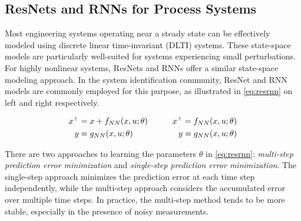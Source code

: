 \documentclass[fontsize=11pt]{article}
\theoremstyle{definition}
\begin{document}
\subsection{ResNets and RNNs for Process Systems}

Most engineering systems operating near a steady state can be effectively modeled 
using discrete linear time-invariant (DLTI) systems. These state-space models are 
particularly well-suited for systems experiencing small perturbations.
For highly nonlinear systems, ResNets and RNNs offer a similar state-space modeling 
approach. In the system identification community, ResNet and RNN models are commonly 
employed for this purpose, as illustrated in \cref{eq:resrnn} on left and right respectively.

\begin{align}
    x^+ &= x + f_{NN} (x, u; \theta) &\qquad x^+ = f_{NN} (x, u; \theta)\notag \\ 
    y &= g_{NN} (x, u; \theta) &\qquad y = g_{NN} (x, u; \theta)
    \label{eq:resrnn}
\end{align}

There are two approaches to learning the parameters $\theta$ in \cref{eq:resrnn}: 
\textit{multi-step prediction error minimization} and \textit{single-step prediction 
error minimization}. 
The single-step approach minimizes the prediction error at each time step independently, 
while the multi-step approach considers the accumulated error over multiple time steps. 
In practice, the multi-step method tends to be more stable, especially in the presence 
of noisy measurements.
\end{document}
